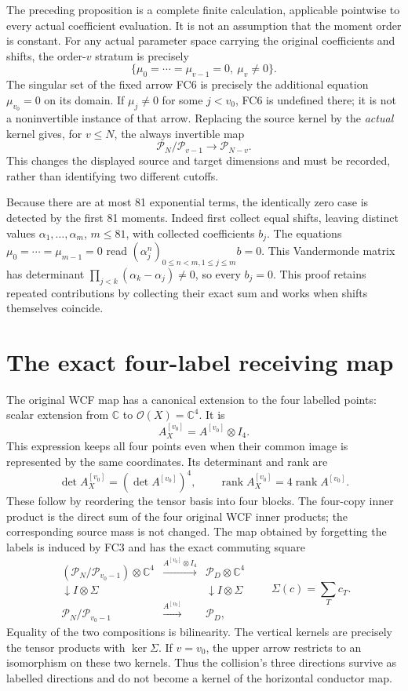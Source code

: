 \documentclass[11pt]{article}
\newcommand{\C}{\mathbb C}
\newcommand{\cP}{\mathcal P}
\newcommand{\rk}{\operatorname{rank}}
\begin{document}
The preceding proposition is a complete finite calculation, applicable
pointwise to every actual coefficient evaluation. It is not an
assumption that the moment order is constant. For any actual parameter
space carrying the original coefficients and shifts, the order-$v$
stratum is precisely
\[
 \{\mu_0=\cdots=\mu_{v-1}=0,\ \mu_v\ne0\}.
\]
The singular set of the fixed arrow FC6 is precisely the additional
equation $\mu_{v_0}=0$ on its domain. If $\mu_j\ne0$ for some
$j<v_0$, FC6 is undefined there; it is not a noninvertible instance
of that arrow. Replacing the source kernel by the \emph{actual} kernel
gives, for $v\le N$, the always invertible map
\[
 \cP_N/\cP_{v-1}\longrightarrow\cP_{N-v}.
\]
This changes the displayed source and target dimensions and must be
recorded, rather than identifying two different cutoffs.

Because there are at most 81 exponential terms, the identically zero
case is detected by the first 81 moments. Indeed first collect equal
shifts, leaving distinct values $\alpha_1,\ldots,\alpha_m$, $m\le81$,
with collected coefficients $b_j$. The equations
$\mu_0=\cdots=\mu_{m-1}=0$ read
$(\alpha_j^n)_{0\le n<m,1\le j\le m}b=0$. This Vandermonde matrix
has determinant $\prod_{j<k}(\alpha_k-\alpha_j)\ne0$, so every
$b_j=0$. This proof retains repeated contributions by collecting their
exact sum and works when shifts themselves coincide.

\section{The exact four-label receiving map}
The original WCF map has a canonical extension to the four labelled
points: scalar extension from $\C$ to $\mathcal O(X)=\C^4$. It is
\begin{equation}
 A^{[v_0]}_X=A^{[v_0]}\otimes I_4.\tag{FC11}
\end{equation}
This expression keeps all four points even when their common image is
represented by the same coordinates. Its determinant and rank are
\begin{equation}
 \det A^{[v_0]}_X=(\det A^{[v_0]})^4,\qquad
 \rk A^{[v_0]}_X=4\rk A^{[v_0]}.\tag{FC12}
\end{equation}
These follow by reordering the tensor basis into four blocks. The
four-copy inner product is the direct sum of the four original WCF
inner products; the corresponding source mass is not changed.
The map obtained by forgetting the labels is induced by FC3 and has
the exact commuting square
\[
\begin{array}{ccc}
 (\cP_N/\cP_{v_0-1})\otimes\C^4
 &\xrightarrow{A^{[v_0]}\otimes I_4}&\cP_D\otimes\C^4\\
 \downarrow I\otimes\Sigma&&\downarrow I\otimes\Sigma\\
 \cP_N/\cP_{v_0-1}&\xrightarrow{A^{[v_0]}}&\cP_D,
\end{array}
\qquad \Sigma(c)=\sum_Tc_T.
\]
Equality of the two compositions is bilinearity. The vertical kernels
are precisely the tensor products with $\ker\Sigma$. If $v=v_0$,
the upper arrow restricts to an isomorphism on these two kernels.
Thus the collision's three directions survive as labelled directions
and do not become a kernel of the horizontal conductor map.
\end{document}

